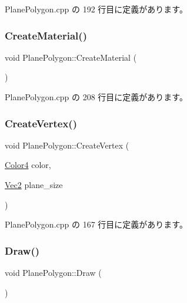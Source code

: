  Plane\+Polygon.\+cpp の 192 行目に定義があります。

\mbox{\label{class_plane_polygon_a4539899c78a222ddc651e45943a7f55b}} 
\subsubsection{\texorpdfstring{Create\+Material()}{CreateMaterial()}}
{\footnotesize\ttfamily void Plane\+Polygon\+::\+Create\+Material (\begin{DoxyParamCaption}{ }\end{DoxyParamCaption})\hspace{0.3cm}{\ttfamily [private]}}



 Plane\+Polygon.\+cpp の 208 行目に定義があります。

\mbox{\label{class_plane_polygon_aa002e213c1b0481c8b8ee56caadd270d}} 
\subsubsection{\texorpdfstring{Create\+Vertex()}{CreateVertex()}}
{\footnotesize\ttfamily void Plane\+Polygon\+::\+Create\+Vertex (\begin{DoxyParamCaption}\item[{\mbox{\hyperlink{_vector3_d_8h_a9c2339f516cf07ce4753b8a99fab3791}{Color4}}}]{color,  }\item[{\mbox{\hyperlink{_vector3_d_8h_a5ef6e95dfc5f9d3820b71772d99bbc25}{Vec2}}}]{plane\+\_\+size }\end{DoxyParamCaption})\hspace{0.3cm}{\ttfamily [private]}}



 Plane\+Polygon.\+cpp の 167 行目に定義があります。

\mbox{\label{class_plane_polygon_a2f20691ee0feee4fa428f5d017d7062a}} 
\subsubsection{\texorpdfstring{Draw()}{Draw()}}
{\footnotesize\ttfamily void Plane\+Polygon\+::\+Draw (\begin{DoxyParamCaption}{ }\end{DoxyParamCaption})}



